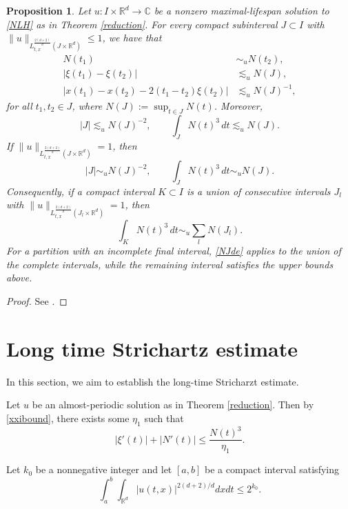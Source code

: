 \documentclass[reqno,11pt]{amsart}
\theoremstyle{plain}
\newtheorem{proposition}[theorem]{Proposition}
\theoremstyle{definition}
\numberwithin{equation}{section}
\numberwithin{theorem}{section}
\def\leq{\leqslant}
\def\R{\mathbb{R}}
\begin{document}
\begin{proposition}\label{zzzz2}
Let $u: I \times \R^d \rightarrow \mathbb{C}$ be a nonzero maximal-lifespan solution to \eqref{NLH} as in Theorem \ref{reduction}. For every compact subinterval $J \subset I$ with $\|u\|_{L_{t, x}^{\frac{2(d+2)}{d}}\left(J \times \R^d\right)} \leq 1$, we have that
\begin{align*}
N\left(t_1\right) & \sim_u N\left(t_2\right), \\
\left|\xi\left(t_1\right)-\xi\left(t_2\right)\right| & \lesssim_u N(J), \\
\left|x\left(t_1\right)-x\left(t_2\right)-2\left(t_1-t_2\right) \xi\left(t_2\right)\right| & \lesssim_u N(J)^{-1},
\end{align*}
for all $t_1,t_2\in J$, where $N(J):=\sup_{t\in J}N(t)$. Moreover,
\[
 |J|\lesssim_u N(J)^{-2},\qquad
 \int_JN(t)^3\,dt\lesssim_u N(J).
\]
If $\|u\|_{L_{t,x}^{\frac{2(d+2)}d}(J\times\R^d)}=1$, then
\[
 |J|\sim_u N(J)^{-2},\qquad
 \int_JN(t)^3\,dt\sim_u N(J).
\]
Consequently, if a compact interval $K\subset I$ is a union of consecutive
intervals $J_l$ with
$\|u\|_{L_{t,x}^{\frac{2(d+2)}d}(J_l\times\R^d)}=1$, then
\begin{equation}\label{NJde}
 \int_KN(t)^3\,dt\sim_u\sum_lN(J_l).
\end{equation}
For a partition with an incomplete final interval, \eqref{NJde} applies to
the union of the complete intervals, while the remaining interval satisfies
the upper bounds above.
\end{proposition}
\begin{proof}
See \cite{Dodson,KV}.
\end{proof}



\section{Long time Strichartz estimate}\label{sec4}
In this section, we aim to establish the long-time Stricharzt estimate. 

Let $u$ be an almost-periodic solution as in Theorem \ref{reduction}. Then by \eqref{xxibound}, there exists some $\eta_1$ such that  
\begin{equation}\label{condi1}
|\xi'(t)| + |N'(t)| \leq \frac{N(t)^3}{\eta_1}. 
\end{equation}


Let $k_0$ be a nonnegative integer and let $[a,b]$ be a compact interval satisfying 
\begin{equation}\label{condi2}
\int_a^b \int_{\R^d} |u(t,x)|^{2(d+2)/d}  dx  dt \leq 2^{k_0}.
\end{equation}
\end{document}
